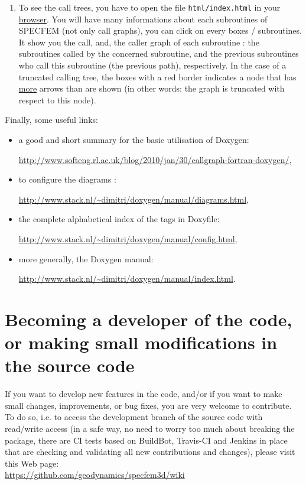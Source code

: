 \begin{enumerate}
\item To see the call trees, you have to open the file \texttt{html/index.html} in your \underline{browser}. You will have many informations about each subroutines of SPECFEM (not only call graphs), you can click on every boxes / subroutines. It show you the call, and, the caller graph of each subroutine : the subroutines called by the concerned subroutine, and the previous subroutines who call this subroutine (the previous path), respectively. In the case of a truncated calling tree, the boxes with a red border indicates a node that has \underline{more} arrows than are shown (in other words: the graph is truncated with respect to this node).

\end{enumerate}

\medskip

\noindent Finally, some useful links:

\begin{itemize}
\item[\textbullet] a good and short summary for the basic utilisation of Doxygen:

\url{http://www.softeng.rl.ac.uk/blog/2010/jan/30/callgraph-fortran-doxygen/},

\item[\textbullet] to configure the diagrams :

\url{http://www.stack.nl/~dimitri/doxygen/manual/diagrams.html},

\item[\textbullet] the complete alphabetical index of the tags in Doxyfile:

\url{http://www.stack.nl/~dimitri/doxygen/manual/config.html},

\item[\textbullet] more generally, the Doxygen manual:

\url{http://www.stack.nl/~dimitri/doxygen/manual/index.html}.

\end{itemize}

\medskip


\section{Becoming a developer of the code, or making small modifications in the source code}

If you want to develop new features in the code, and/or if you want to make small changes, improvements, or bug fixes, you are very welcome to contribute. To do so, i.e. to access the development branch of the source code with read/write access (in a safe way, no need to worry too much about breaking the package, there are CI tests based on BuildBot, Travis-CI and Jenkins in place that are checking and validating all new contributions and changes), please visit this Web page:\\
\url{https://github.com/geodynamics/specfem3d/wiki}

